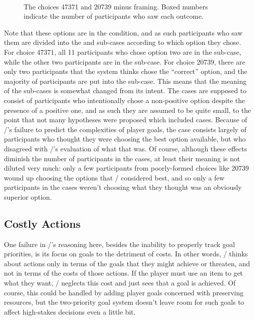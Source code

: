 \begin{figure}[p]
 \\
\caption[``Obvious success'' choices 47371 and 20739]{The \obvs{} choices 47371 and 20739 minus framing. Boxed numbers indicate the number of participants who saw each outcome.}
\label{fig:e2-seeds-47371-20739}
\end{figure}


Note that these options are in the \obvs{} condition, and as such participants who saw them are divided into the \prq{[main]}{} and \prq{[alt]}{} sub-cases according to which option they chose.
%
For choice 47371, all 11 participants who chose option two are in the \prq{[main]}{} sub-case, while the other two participants are in the \prq{[alt]}{} sub-case.
%
For choice 20739, there are only two participants that the system thinks chose the ``correct'' option, and the majority of participants are put into the \prq{[alt]}{} sub-case.
%
This means that the meaning of the sub-cases is somewhat changed from its intent.
%
The \prq{[alt]}{} cases are supposed to consist of participants who intentionally chose a non-positive option despite the presence of a positive one, and as such they are assumed to be quite small, to the point that not many hypotheses were proposed which included \prq{[alt]}{} cases.
%
Because of \dunyazad/'s failure to predict the complexities of player goals, the \prq{[alt]}{} case consists largely of participants who thought they were choosing the best option available, but who disagreed with \dunyazad/'s evaluation of what that was.
%
Of course, although these effects diminish the number of participants in the \prq{[main]}{} cases, at least their meaning is not diluted very much: only a few participants from poorly-formed choices like 20739 wound up choosing the options that \dunyazad/ considered best, and so only a few participants in the \prq{[main]}{} cases weren't choosing what they thought was an obviously superior option.


\subsection{Costly Actions}

One failure in \dunyazad/'s reasoning here, besides the inability to properly track goal priorities, is its focus on goals to the detriment of costs.
%
In other words, \dunyazad/ thinks about actions only in terms of the goals that they might achieve or threaten, and not in terms of the costs of those actions.
%
If the player must use an item to get what they want, \dunyazad/ neglects this cost and just sees that a goal is achieved.
%
Of course, this could be handled by adding player goals concerned with preserving resources, but the two-priority goal system doesn't leave room for such goals to affect high-stakes decisions even a little bit.

